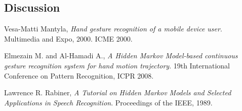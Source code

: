 \documentclass[twoside]{article}
\begin{document}
\begin{multicols}{2}
\section{Discussion}


\begin{thebibliography}{2} %

Vesa-Matti Mantyla, \emph{Hand gesture recognition of a mobile device user}. Multimedia and Expo, 2000. ICME 2000.

Elmezain M. and Al-Hamadi A., \emph{A Hidden Markov Model-based continuous gesture recognition system for hand motion trajectory}. 19th International Conference on Pattern Recognition, ICPR 2008.

Lawrence R. Rabiner, \emph{A Tutorial on Hidden Markov Models and Selected Applications in Speech Recognition}. Proceedings of the IEEE, 1989.

\end{thebibliography}


\end{multicols}
\end{document}
